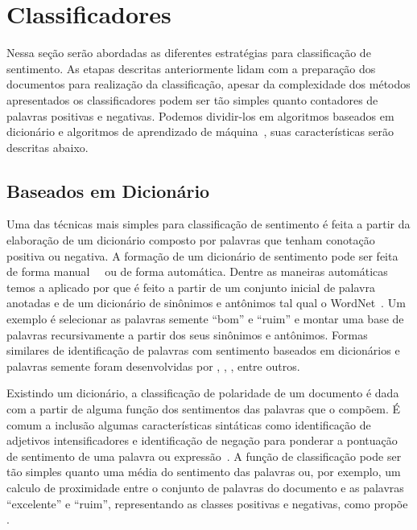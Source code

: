 \section{Classificadores}

Nessa seção serão abordadas as diferentes estratégias para classificação de
sentimento.
As etapas descritas anteriormente lidam com a preparação dos documentos para
realização da classificação, apesar da complexidade dos métodos apresentados os
classificadores podem ser tão simples quanto contadores de palavras positivas e
negativas.
Podemos dividir-los em algoritmos baseados em dicionário e algoritmos de
aprendizado de máquina~\cite{taboada11}, suas características serão descritas
abaixo.

\subsection{Baseados em Dicionário} \label{sec:dictionary}

Uma das técnicas mais simples para classificação de sentimento é feita a partir
da elaboração de um dicionário composto por palavras que tenham conotação
positiva ou negativa.
A formação de um dicionário de sentimento pode ser feita de forma
manual~\cite{stone66}~\cite{tong01} ou de forma automática.
Dentre as maneiras automáticas temos a aplicado por \citet{hu04} que é feito a
partir de um conjunto inicial de palavra anotadas e de um dicionário de
sinônimos e antônimos tal qual o WordNet~\cite{miller90}.
Um exemplo é selecionar as palavras semente ``bom'' e ``ruim'' e montar uma base de
palavras recursivamente a partir dos seus sinônimos e antônimos.
Formas similares de identificação de palavras com sentimento baseados em
dicionários e palavras semente foram desenvolvidas por \citet{blair08},
\citet{rao09}, \citet{hassan10}, entre outros.

Existindo um dicionário, a classificação de polaridade de um documento é dada
com a partir de alguma função dos sentimentos das palavras que o compõem.
É comum a inclusão algumas características sintáticas como identificação de
adjetivos intensificadores e identificação de negação para ponderar a pontuação
de sentimento de uma palavra ou expressão~\cite{taboada11}.
A função de classificação pode ser tão simples quanto uma média do sentimento
das palavras ou, por exemplo, um calculo de proximidade entre o conjunto de
palavras do documento e as palavras ``excelente'' e ``ruim'', representando as
classes positivas e negativas, como propõe \citet{turney02}.

